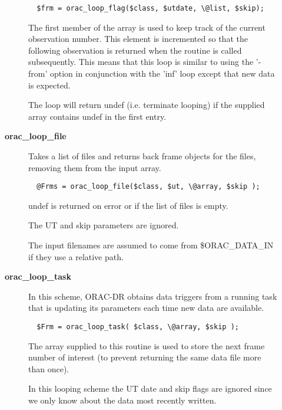 \begin{description}
\begin{description}
\begin{verbatim}
  $frm = orac_loop_flag($class, $utdate, \@list, $skip);
\end{verbatim}


The first member of the array is used to keep track of the
current observation number. This element is incremented so that
the following observation is returned when the routine is called
subsequently. This means that this loop is similar to using the
'-from' option in conjunction with the 'inf' loop except that
new data is expected.



The loop will return undef (i.e. terminate looping) if the
supplied array contains undef in the first entry.


\item[{\textbf{orac\_loop\_file}}] \mbox{}

Takes a list of files and returns back frame objects for the files,
removing them from the input array.

\begin{verbatim}
  @Frms = orac_loop_file($class, $ut, \@array, $skip );
\end{verbatim}


undef is returned on error or if the list of files is empty.



The UT and skip parameters are ignored.



The input filenames are assumed to come from \$ORAC\_DATA\_IN if they use
a relative path.


\item[{\textbf{orac\_loop\_task}}] \mbox{}

In this scheme, ORAC-DR obtains data triggers from a running task
that is updating its parameters each time new data are available.

\begin{verbatim}
  $Frm = orac_loop_task( $class, \@array, $skip );
\end{verbatim}


The array supplied to this routine is used to store the next frame
number of interest (to prevent returning the same data file more than once).



In this looping scheme the UT date and skip flags are ignored since we
only know about the data most recently written.

\end{description}

\end{description}
